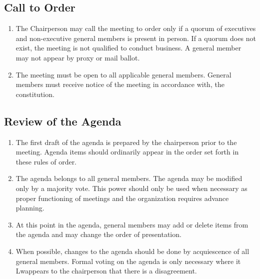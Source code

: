 \documentclass[12pt]{article}
\begin{document}
\subsection{Call to Order}
\begin{enumerate}[{A.1}.1]
    \item The Chairperson may call the meeting to order only if a quorum of executives and non-executive general members is present in person. If a quorum does not exist, the meeting is not qualified to conduct business. A general member may not appear by proxy or mail ballot.
    \item The meeting must be open to all applicable general members. General members must receive notice of the meeting in accordance with, the constitution.
\end{enumerate}


\subsection{Review of the Agenda}
\begin{enumerate}[{A.2}.1]
    \item The first draft of the agenda is prepared by the chairperson prior to the meeting. Agenda items should ordinarily appear in the order set forth in these rules of order. 
    \item The agenda belongs to all general members. The agenda may be modified only by a majority vote. This power should only be used when necessary as proper functioning of meetings and the organization requires advance planning. 
    \item At this point in the agenda, general members may add or delete items from the agenda and may change the order of presentation.
    \item When possible, changes to the agenda should be done by acquiescence of all general members. Formal voting on the agenda is only necessary where it Lwappears to the chairperson that there is a disagreement.
\end{enumerate}


\end{document}
